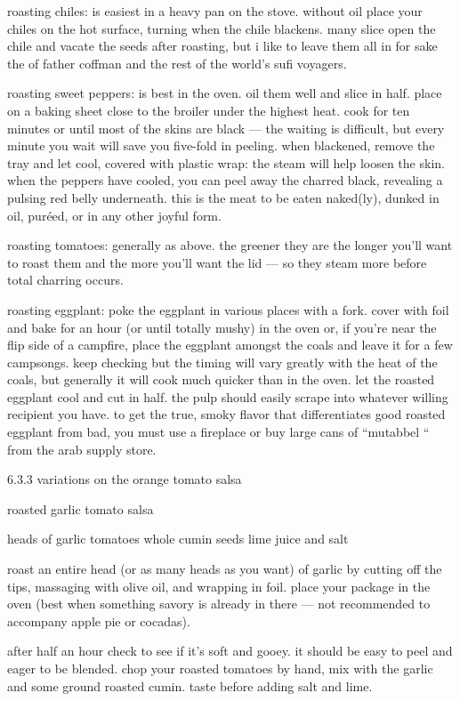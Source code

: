 roasting chiles:
	is easiest in a heavy pan on the stove. without oil place your chiles on the hot surface, turning when the chile blackens. many slice open the chile and vacate the seeds after roasting, but i like to leave them all in for sake the of father coffman and the rest of the world's sufi voyagers.

roasting sweet peppers:
	is best in the oven. oil them well and slice in half. place on a baking sheet close to the broiler under the highest heat. cook for ten minutes or until most of the skins are black --- the waiting is difficult, but every minute you wait will save you five-fold in peeling. when blackened, remove the tray and let cool, covered with plastic wrap: the steam will help loosen the skin. when the peppers have cooled, you can peel away the charred black, revealing a pulsing red belly underneath. this is the meat to be eaten naked(ly), dunked in oil, pur\'{e}ed, or in any other joyful form.

roasting tomatoes:
	generally as above. the greener they are the longer you'll want to roast them and the more you'll want the lid --- so they steam more before total charring occurs.

roasting eggplant:
	poke the eggplant in various places with a fork. cover with foil and bake for an hour (or until totally mushy) in the oven or, if you're near the flip side of a campfire, place the eggplant amongst the coals and leave it for a few campsongs. keep checking but the timing will vary greatly with the heat of the coals, but generally it will cook much quicker than in the oven.
	let the roasted eggplant cool and cut in half. the pulp should easily scrape into whatever willing recipient you have. to get the true, smoky flavor that differentiates good roasted eggplant from bad, you must use a fireplace or buy large cans of ``mutabbel `` from the arab supply store.

6.3.3  variations on the orange tomato salsa

roasted garlic tomato salsa

heads of garlic
tomatoes
whole cumin seeds
lime juice and salt

roast an entire head (or as many heads as you want) of garlic by cutting off the tips, massaging with olive oil, and wrapping in foil. place your package in the oven (best when something savory is already in there --- not recommended to accompany apple pie or cocadas).

after half an hour check to see if it's soft and gooey. it should be easy to peel and eager to be blended. chop your roasted tomatoes by hand, mix with the garlic and some ground roasted cumin. taste before adding salt and lime.

